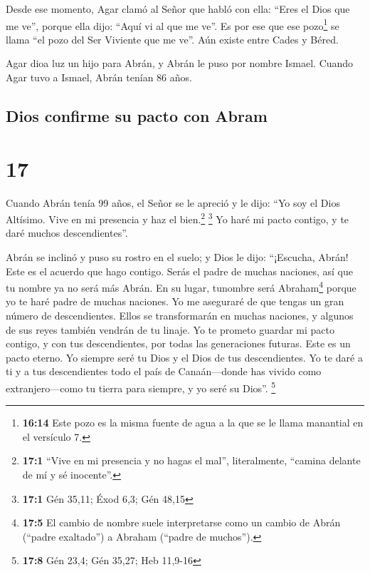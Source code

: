  Desde ese momento, Agar clamó al Señor que habló con
ella: ``Eres el Dios que me ve'', porque ella dijo: ``Aquí vi al que me
ve''.  Es por ese que ese pozo\footnote{\textbf{16:14}
  Este pozo es la misma fuente de agua a la que se le llama manantial en
  el versículo 7.} se llama ``el pozo del Ser Viviente que me ve''. Aún
existe entre Cades y Béred.

 Agar dioa luz un hijo para Abrán, y Abrán le puso por
nombre Ismael.  Cuando Agar tuvo a Ismael, Abrán tenían
86 años.

\hypertarget{dios-confirme-su-pacto-con-abram}{%
\subsection{Dios confirme su pacto con
Abram}\label{dios-confirme-su-pacto-con-abram}}

\hypertarget{section-16}{%
\section{17}\label{section-16}}

 Cuando Abrán tenía 99 años, el Señor se le apreció y le
dijo: ``Yo soy el Dios Altísimo. Vive en mi presencia y haz el
bien.\footnote{\textbf{17:1} ``Vive en mi presencia y no hagas el mal'',
  literalmente, ``camina delante de mí y sé inocente''.} \footnote{\textbf{17:1}
  Gén 35,11; Éxod 6,3; Gén 48,15}  Yo haré mi pacto
contigo, y te daré muchos descendientes''.

 Abrán se inclinó y puso su rostro en el suelo; y Dios le
dijo:  ``¡Escucha, Abrán! Este es el acuerdo que hago
contigo. Serás el padre de muchas naciones,  así que tu
nombre ya no será más Abrán. En su lugar, tunombre será
Abraham\footnote{\textbf{17:5} El cambio de nombre suele interpretarse
  como un cambio de Abrán (``padre exaltado'') a Abraham (``padre de
  muchos'').} porque yo te haré padre de muchas naciones. 
Yo me aseguraré de que tengas un gran número de descendientes. Ellos se
transformarán en muchas naciones, y algunos de sus reyes también vendrán
de tu linaje.  Yo te prometo guardar mi pacto contigo, y
con tus descendientes, por todas las generaciones futuras. Este es un
pacto eterno. Yo siempre seré tu Dios y el Dios de tus descendientes.
 Yo te daré a ti y a tus descendientes todo el país de
Canaán---donde has vivido como extranjero---como tu tierra para siempre,
y yo seré su Dios''. \footnote{\textbf{17:8} Gén 23,4; Gén 35,27; Heb
  11,9-16}

